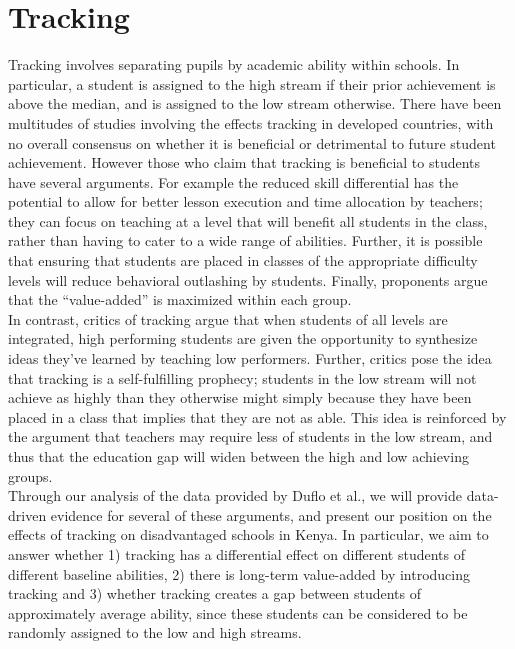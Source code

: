 \documentclass[11pt]{article}
\begin{document}
\section{Tracking}
Tracking involves separating pupils by academic ability within schools. In particular, a student is assigned to the high stream if their prior achievement is above the median, and is assigned to the low stream otherwise. There have been multitudes of studies involving the effects tracking in developed countries, with no overall consensus on whether it is beneficial or detrimental to future student achievement. However those who claim that tracking is beneficial to students have several arguments. For example the reduced skill differential has the potential to allow for better lesson execution and time allocation by teachers; they can focus on teaching at a level that will benefit all students in the class, rather than having to cater to a wide range of abilities. Further, it is possible that ensuring that students are placed in classes of the appropriate difficulty levels will reduce behavioral outlashing by students. Finally, proponents argue that the ``value-added'' is maximized within each group.\\

In contrast, critics of tracking argue that when students of all levels are integrated, high performing students are given the opportunity to synthesize ideas they've learned by teaching low performers. Further, critics pose the idea that tracking is a self-fulfilling prophecy; students in the low stream will not achieve as highly than they otherwise might simply because they have been placed in a class that implies that they are not as able. This idea is reinforced by the argument that teachers may require less of students in the low stream, and thus that the education gap will widen between the high and low achieving groups.\\

Through our analysis of the data provided by Duflo et al., we will provide data-driven evidence for several of these arguments, and present our position on the effects of tracking on disadvantaged schools in Kenya. In particular, we aim to answer whether 1) tracking has a differential effect on different students of different baseline abilities, 2) there is long-term value-added by introducing tracking and 3) whether tracking creates a gap between students of approximately average ability, since these students can be considered to be randomly assigned to the low and high streams.
 
\end{document}
